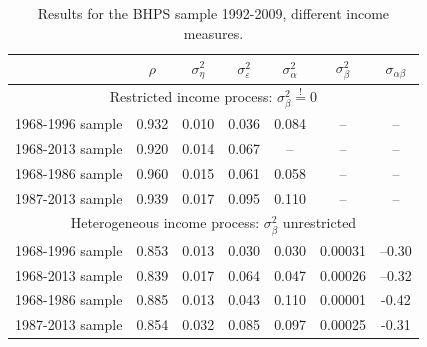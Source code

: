 \begin{table}%
\begin{tabular}{l|cccccc}
                    &$\rho$ & $\sigma^2_{\eta}$&$\sigma^2_{\varepsilon}$&$\sigma^2_{\alpha}$&$\sigma^2_{\beta}$&$\sigma_{\alpha \beta}$\\
\hline
\hline 
\multicolumn{7}{c}{Restricted income process: $\sigma^2_{\beta} \stackrel{!}{=} 0$} \\
1968-1996 sample & 0.932 &  0.010           &   0.036                &       0.084       &        --        &        --             \\
1968-2013 sample & 0.920 &  0.014           &   0.067                &       --          &        --        &        --             \\
1968-1986 sample & 0.960 &  0.015           &   0.061                &       0.058       &        --        &        --             \\
1987-2013 sample & 0.939 &  0.017           &   0.095                &       0.110       &        --        &        --             \\
\hline
\multicolumn{7}{c}{Heterogeneous income process: $\sigma^2_{\beta}$ unrestricted} \\
\hline
1968-1996 sample & 0.853 &  0.013           &   0.030                &   0.030           &     0.00031      &     --0.30            \\
1968-2013 sample & 0.839 &  0.017           &   0.064                &   0.047           &     0.00026      &     --0.32            \\
1968-1986 sample & 0.885 &  0.013           &   0.043                &       0.110       &      0.00001     &      -0.42            \\
1987-2013 sample & 0.854 &  0.032           &   0.085                &       0.097       &      0.00025     &      -0.31            \\
\hline
\end{tabular}
\caption{Results for the BHPS sample 1992-2009, different income measures.}
\label{tab:PSID_results}
\end{table}
